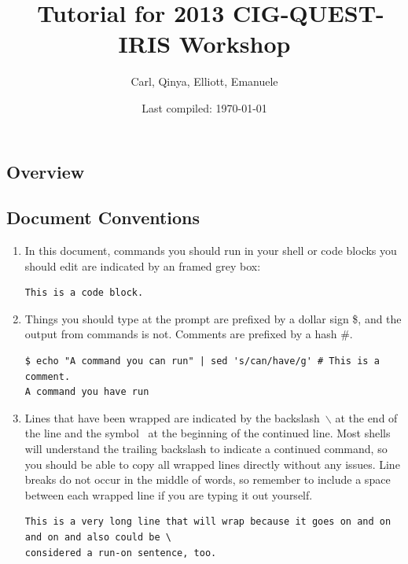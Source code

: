 \documentclass[10pt,fleqn,letterpaper]{article}
\title{\specfem\ Tutorial for 2013 CIG-QUEST-IRIS Workshop}
\author{Carl, Qinya, Elliott, Emanuele}
\date{Last compiled: \today}
\begin{document}

\maketitle



\subsection*{Overview}


\subsection*{Document Conventions}

\begin{enumerate}
\item In this document, commands you should run in your shell or code blocks
      you should edit are indicated by an framed grey box:
\begin{lstlisting}
This is a code block.
\end{lstlisting}

\item Things you should type at the prompt are prefixed by a dollar sign \$,
      and the output from commands is not. Comments are prefixed by a hash \#.
\begin{lstlisting}
$ echo "A command you can run" | sed 's/can/have/g' # This is a comment.
A command you have run
\end{lstlisting}

\item Lines that have been wrapped are indicated by the backslash~$\backslash$ at the
      end of the line and the symbol~\textcolor{red}{}
      at the beginning of the continued line. Most shells will understand the trailing
      backslash to indicate a continued command, so you should be able to copy all
      wrapped lines directly without any issues. Line breaks do not occur in the
      middle of words, so remember to include a space between each wrapped line if
      you are typing it out yourself.
\begin{lstlisting}
This is a very long line that will wrap because it goes on and on and on and also could be \
considered a run-on sentence, too.
\end{lstlisting}
\end{enumerate}
\end{document}
